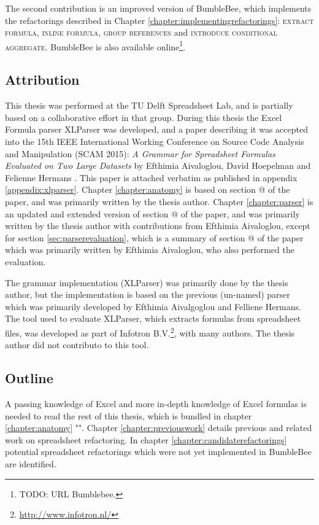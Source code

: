 \documentclass[12pt,a4paper,onecolumn,oneside,parskip]{memoir}
\makeatletter
\newcommand{\rf}[1]{\textsc{\lowercase{#1}}}
\newcommand*{\rom}[1]{\expandafter\@slowromancap\romannumeral #1@}
\makeatother
\begin{document}
The second contribution is an improved version of BumbleBee, which implements the refactorings described in Chapter \ref{chapter:implementingrefactorings}: \rf{Extract Formula}, \rf{Inline Formula}, \rf{Group References} and \rf{Introduce Conditional Aggregate}.
BumbleBee is also available online\footnote{TODO: URL Bumblebee.}.

\subsection{Attribution}

This thesis was performed at the TU Delft Spreadsheet Lab, and is partially based on a collaborative effort in that group.
During this thesis the Excel Formula parser XLParser was developed, and a paper describing it was accepted into the 15th IEEE International Working Conference on Source Code Analysis and Manipulation (SCAM 2015): \emph{A Grammar for Spreadsheet Formulas Evaluated on Two Large Datasets} by Efthimia Aivaloglou, David Hoepelman and Felienne Hermans \cite{xlparser}.
This paper is attached verbatim as published in appendix \ref{appendix:xlparser}.
Chapter \ref{chapter:anatomy} is based on section \rom{2} of the paper, and was primarily written by the thesis author.
Chapter \ref{chapter:parser}  is an updated and extended version of section \rom{3} of the paper, and was primarily written by the thesis author with contributions from Efthimia Aivaloglou, except for section \ref{sec:parserevaluation}, which is a summary of section \rom{4} of the paper which was primarily written by Efthimia Aivaloglou, who also performed the evaluation.

The grammar implementation (XLParser) was primarily done by the thesis author, but the implementation is based on the previous (un-named) parser which was primarily developed by Efthimia Aivalgoglou and Felliene Hermans.
The tool used to evaluate XLParser, which extracts formulas from spreadsheet files, was developed as part of Infotron B.V.\footnote{\url{http://www.infotron.nl/}}, with many authors. The thesis author did not contributo to this tool.

\subsection{Outline}

A passing knowledge of Excel and more in-depth knowledge of Excel formulas is needed to read the rest of this thesis, which is bundled in chapter \ref{chapter:anatomy} "".
Chapter \ref{chapter:previouswork} details previous and related work on spreadsheet refactoring.
In chapter \ref{chapter:candidaterefactorings} potential spreadsheet refactorings which were not yet implemented in BumbleBee are identified.
\end{document}
